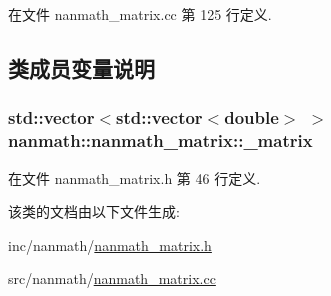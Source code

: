在文件 nanmath\+\_\+matrix.\+cc 第 125 行定义.



\subsection{类成员变量说明}
\hypertarget{classnanmath_1_1nanmath__matrix_a2e376e4d599abc18c1bac142dcc89ab2}{}
\subsubsection[{\+\_\+matrix}]{\setlength{\rightskip}{0pt plus 5cm}std\+::vector$<$std\+::vector$<$double$>$ $>$ nanmath\+::nanmath\+\_\+matrix\+::\+\_\+matrix\hspace{0.3cm}{\ttfamily [protected]}}\label{classnanmath_1_1nanmath__matrix_a2e376e4d599abc18c1bac142dcc89ab2}


在文件 nanmath\+\_\+matrix.\+h 第 46 行定义.



该类的文档由以下文件生成\+:\begin{DoxyCompactItemize}
\item 
inc/nanmath/\hyperlink{nanmath__matrix_8h}{nanmath\+\_\+matrix.\+h}\item 
src/nanmath/\hyperlink{nanmath__matrix_8cc}{nanmath\+\_\+matrix.\+cc}\end{DoxyCompactItemize}
